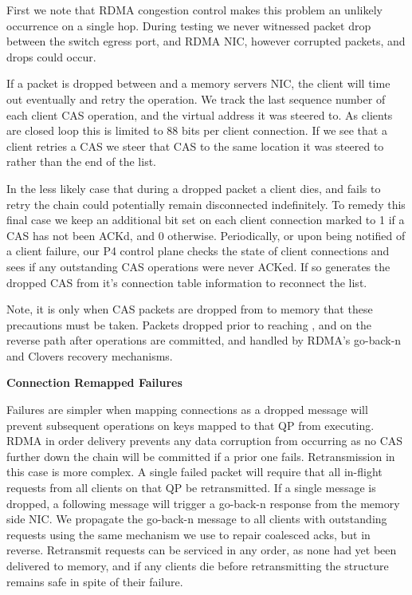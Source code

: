 First we note that RDMA congestion control makes this problem an unlikely
occurrence on a single hop. During testing we never witnessed packet drop
between the switch egress port, and RDMA NIC, however corrupted packets, and
drops could occur.

If a packet is dropped between \sword and a memory servers NIC, the client will
time out eventually and retry the operation. We track the last sequence number
of each client CAS operation, and the virtual address it was steered to. As
clients are closed loop this is limited to 88 bits per client connection. If we
see that a client retries a CAS we steer that CAS to the same location it was
steered to rather than the end of the list.

In the less likely case that during a dropped packet a client dies, and fails to
retry the chain could potentially remain disconnected indefinitely. To remedy
this final case we keep an additional bit set on each client connection marked
to 1 if a CAS has not been ACKd, and 0 otherwise. Periodically, or upon being
notified of a client failure, our P4 control plane checks the state of client
connections and sees if any outstanding CAS operations were never ACKed. If so
\sword generates the dropped CAS from it's connection table information to
reconnect the list.

Note, it is only when CAS packets are dropped from \sword to memory that these
precautions must be taken. Packets dropped prior to reaching \sword, and on the
reverse path after operations are committed, and handled by RDMA's go-back-n and
Clovers recovery mechanisms.

\textbf{Connection Remapped Failures}

Failures are simpler when mapping connections as a dropped message will prevent
subsequent operations on keys mapped to that QP from executing.  RDMA in order
delivery prevents any data corruption from occurring as no CAS further down the
chain will be committed if a prior one fails. Retransmission in this case is
more complex. A single failed packet will require that all in-flight requests
from all clients on that QP be retransmitted. If a single message is dropped, a
following message will trigger a go-back-n response from the memory side NIC. We
propagate the go-back-n message to all clients with outstanding requests using
the same mechanism we use to repair coalesced acks, but in reverse.  Retransmit
requests can be serviced in any order, as none had yet been delivered to memory,
and if any clients die before retransmitting the structure remains safe in spite
of their failure.

